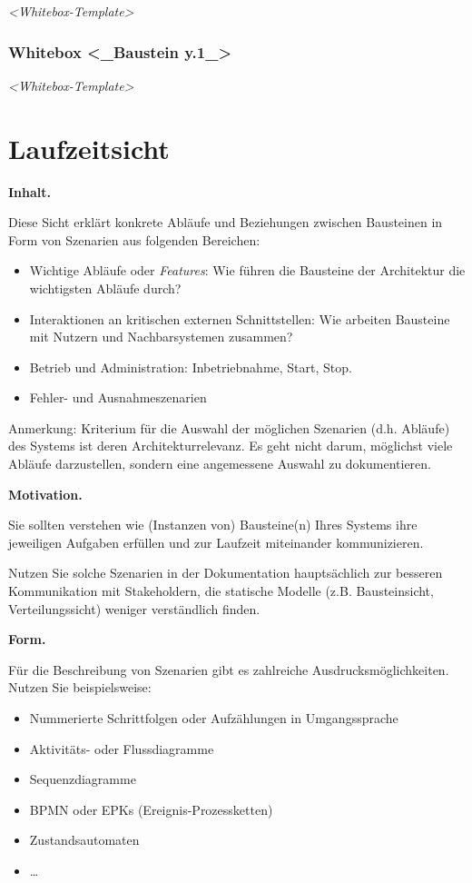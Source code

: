 \documentclass[]{article}
\begin{document}
\emph{\textless{}Whitebox-Template\textgreater{}}

\subsubsection{Whitebox \textless{}\_Baustein
y.1\_\textgreater{}}\label{_whitebox_baustein_y_1}

\emph{\textless{}Whitebox-Template\textgreater{}}

\section{Laufzeitsicht}\label{section-runtime-view}

\textbf{Inhalt.}

Diese Sicht erklärt konkrete Abläufe und Beziehungen zwischen Bausteinen
in Form von Szenarien aus folgenden Bereichen:

\begin{itemize}
\item
  Wichtige Abläufe oder \emph{Features}: Wie führen die Bausteine der
  Architektur die wichtigsten Abläufe durch?
\item
  Interaktionen an kritischen externen Schnittstellen: Wie arbeiten
  Bausteine mit Nutzern und Nachbarsystemen zusammen?
\item
  Betrieb und Administration: Inbetriebnahme, Start, Stop.
\item
  Fehler- und Ausnahmeszenarien
\end{itemize}

Anmerkung: Kriterium für die Auswahl der möglichen Szenarien (d.h.
Abläufe) des Systems ist deren Architekturrelevanz. Es geht nicht darum,
möglichst viele Abläufe darzustellen, sondern eine angemessene Auswahl
zu dokumentieren.

\textbf{Motivation.}

Sie sollten verstehen wie (Instanzen von) Bausteine(n) Ihres Systems
ihre jeweiligen Aufgaben erfüllen und zur Laufzeit miteinander
kommunizieren.

Nutzen Sie solche Szenarien in der Dokumentation hauptsächlich zur
besseren Kommunikation mit Stakeholdern, die statische Modelle (z.B.
Bausteinsicht, Verteilungssicht) weniger verständlich finden.

\textbf{Form.}

Für die Beschreibung von Szenarien gibt es zahlreiche
Ausdrucksmöglichkeiten. Nutzen Sie beispielsweise:

\begin{itemize}
\item
  Nummerierte Schrittfolgen oder Aufzählungen in Umgangssprache
\item
  Aktivitäts- oder Flussdiagramme
\item
  Sequenzdiagramme
\item
  BPMN oder EPKs (Ereignis-Prozessketten)
\item
  Zustandsautomaten
\item
  \ldots{}
\end{itemize}
\end{document}
